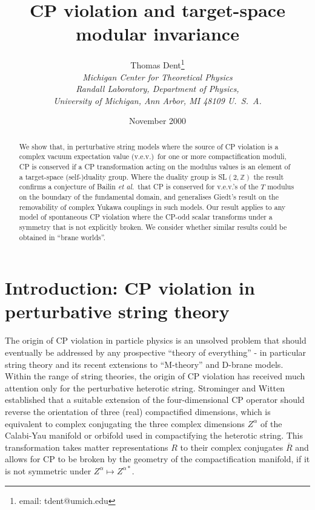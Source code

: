 \documentclass[a4paper,12pt]{article}
\title{\preprintno{{\bf MCTP-00-07}}
CP violation and target-space modular invariance}
\author{Thomas Dent\thanks{email: tdent@umich.edu} \\
	{\em Michigan Center for Theoretical Physics} \\
        {\em Randall Laboratory, Department of Physics,} \\
        {\em University of Michigan, Ann Arbor, MI 48109 U.\ S.\ A.}}
\date{November 2000}
\begin{document}
\maketitle

\begin{abstract}
We show that, in perturbative string models where the source of CP violation is a complex vacuum expectation value (v.e.v.)\ for one or more compactification moduli, CP is conserved if a CP transformation acting on the modulus values is an element of a target-space \mbox{(self-)duality} group. Where the duality group is SL$(2,\mathbb{Z})$ the result confirms a conjecture of Bailin {\em et al.\/}\ that CP is conserved for v.e.v.'s of the $T$ modulus on the boundary of the fundamental domain, and generalises Giedt's result on the removability of complex Yukawa couplings in such models. Our result applies to any model of spontaneous CP violation where the CP-odd scalar transforms under a symmetry that is not explicitly broken. We consider whether similar results could be obtained in ``brane worlds''.
\end{abstract}

\section{Introduction: CP violation in perturbative string theory} 
The origin of CP violation in particle physics is an unsolved problem that should eventually be addressed by any prospective ``theory of everything'' - in particular string theory and its recent extensions to ``M-theory'' and D-brane models. Within the range of string theories, the origin of CP violation has received much attention only for the perturbative heterotic string. Strominger and Witten \cite{StroWitten85} established that a suitable extension of the four-dimensional CP operator should reverse the orientation of three (real) compactified dimensions, which is equivalent to complex conjugating the three complex dimensions $Z^\alpha$ of the Calabi-Yau manifold or orbifold used in compactifying the heterotic string. This transformation takes matter representations $R$ to their complex conjugates $\overline{R}$ and allows for CP to be broken by the geometry of the compactification manifold, if it is not symmetric under $Z^\alpha\mapsto Z^{\alpha*}$. 
\end{document}
